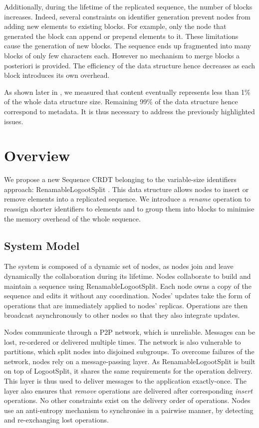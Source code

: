 \documentclass[10pt,journal,compsoc]{IEEEtran}
\begin{document}
Additionally, during the lifetime of the replicated sequence, the number of blocks increases.
Indeed, several constraints on identifier generation prevent nodes from adding new elements to existing blocks.
For example, only the node that generated the block can append or prepend elements to it.
These limitations cause the generation of new blocks.
The sequence ends up fragmented into many blocks of only few characters each.
However no mechanism to merge blocks a posteriori is provided.
The efficiency of the data structure hence decreases as each block introduces its own overhead.

As shown later in , we measured that content eventually represents less than 1\% of the whole data structure size.
Remaining 99\% of the data structure hence correspond to metadata.
It is thus necessary to address the previously highlighted issues.

\section{Overview}
\label{sec:overview}

We propose a new Sequence \ac{CRDT} belonging to the variable-size identifiers approach: RenamableLogootSplit \cite{nicolas:hal-01932552,nicolas:hal-02526724}.
This data structure allows nodes to insert or remove elements into a replicated sequence.
We introduce a \emph{rename} operation to reassign shorter identifiers to elements and to group them into blocks to minimise the memory overhead of the whole sequence.

\subsection{System Model}

The system is composed of a dynamic set of nodes, as nodes join and leave dynamically the collaboration during its lifetime.
Nodes collaborate to build and maintain a sequence using RenamableLogootSplit.
Each node owns a copy of the sequence and edits it without any coordination.
Nodes' updates take the form of operations that are immediately applied to nodes' replicas.
Operations are then broadcast asynchronously to other nodes so that they also integrate updates.

Nodes communicate through a \ac{P2P} network, which is unreliable.
Messages can be lost, re-ordered or delivered multiple times.
The network is also vulnerable to partitions, which split nodes into disjoined subgroups.
To overcome failures of the network, nodes rely on a message-passing layer.
As RenamableLogootSplit is built on top of LogootSplit, it shares the same requirements for the operation delivery.
This layer is thus used to deliver messages to the application exactly-once.
The layer also ensures that \emph{remove} operations are delivered after corresponding \emph{insert} operations.
No other constraints exist on the delivery order of operations.
Nodes use an anti-entropy mechanism \cite{10.1109/TSE.1983.236733} to synchronise in a pairwise manner, by detecting and re-exchanging lost operations.
\end{document}
